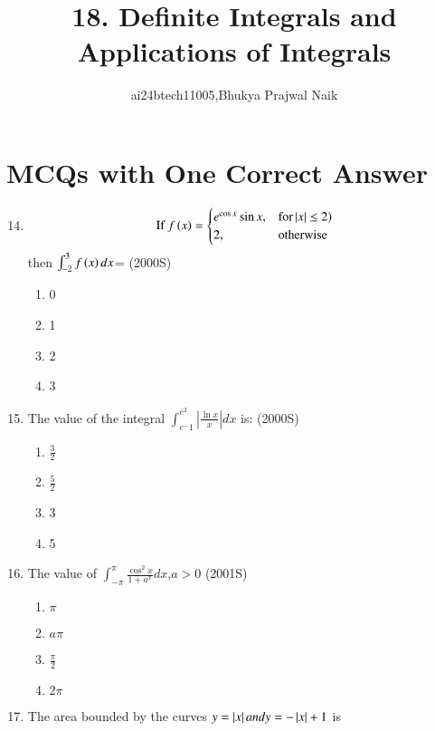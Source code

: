 \documentclass[journal,12pt,twocolumn]{IEEEtran}
\theoremstyle{remark}
\begin{document}

\vspace{3cm}

\title{18. Definite Integrals and Applications of Integrals}
\author{ai24btech11005,Bhukya Prajwal Naik}
\maketitle
\section{MCQs with One Correct Answer}

\begin{enumerate}
\setcounter{enumi}{13}   
\item
\begin{equation}
	\text{If } f\left(x\right) = 
\begin{cases}
	e^{\cos x}\sin x, & \text{for} \left\vert x\right\vert \leq 2)\\
	2, & \text{otherwise}\\
\end{cases}
\end{equation}
then $\int_{-2}^{3}f\left(x\right) dx$=
		\hfill(2000S)
\begin{enumerate}
    \item 0
    \item 1
    \item 2
    \item 3
\end{enumerate}
\item The value of the integral $\int_{e^-1}^{e^2}\left|\frac{\ln x}{x}\right| dx$ is:
	\hfill(2000S)
\begin{enumerate}
	\item $\frac{3}{2}$
	\item $\frac{5}{2}$
    \item  3
    \item  5
\end{enumerate}
\item The value of $\int_{-\pi}^{\pi}\frac{\cos^2 x}{1+a^ x } dx$,$a>0$
	\hfill(2001S)
\begin{enumerate}
    \item$\pi$
    \item $a\pi$
    \item $\frac{\pi}{2}$
    \item $2\pi$
\end{enumerate}
\item The area bounded by the curves $y=\left\vert x\right\vert and y=-\left\vert x\right\vert+1$ is

\end{enumerate}
\end{document}
